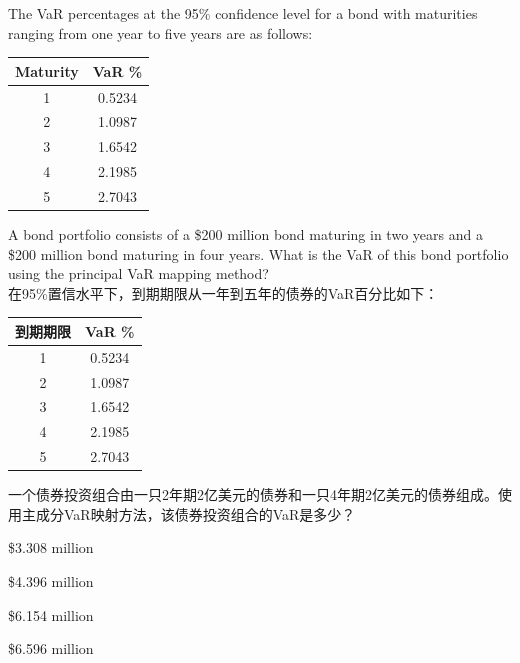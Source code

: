 \documentclass{article}
\newcounter{question} %
\begin{document}
\begin{question}
    The VaR percentages at the 95\% confidence level for a bond with maturities ranging from one year to five years are as follows:
    \begin{table}[H]
        \centering
        \begin{tabular}{|c|c|}
            \hline
            Maturity & VaR \% \\
            \hline
            1 & 0.5234 \\
            2 & 1.0987 \\
            3 & 1.6542 \\
            4 & 2.1985 \\
            5 & 2.7043 \\
            \hline
        \end{tabular}
    \end{table}

    A bond portfolio consists of a \$200 million bond maturing in two years and a \$200 million bond maturing in four years. What is the VaR of this bond portfolio using the principal VaR mapping method?
    \\    在95\%置信水平下，到期期限从一年到五年的债券的VaR百分比如下：
    \begin{table}[H]
        \centering
        \begin{tabular}{|c|c|}
            \hline
            到期期限 & VaR \% \\
            \hline
            1 & 0.5234 \\
            2 & 1.0987 \\
            3 & 1.6542 \\
            4 & 2.1985 \\
            5 & 2.7043 \\
            \hline
        \end{tabular}
    \end{table}

    一个债券投资组合由一只2年期2亿美元的债券和一只4年期2亿美元的债券组成。使用主成分VaR映射方法，该债券投资组合的VaR是多少？
\end{question}

\begin{choices}
    \item \$3.308 million
    \item \$4.396 million
    \item \$6.154 million
    \item \$6.596 million
\end{choices}
\end{document}
